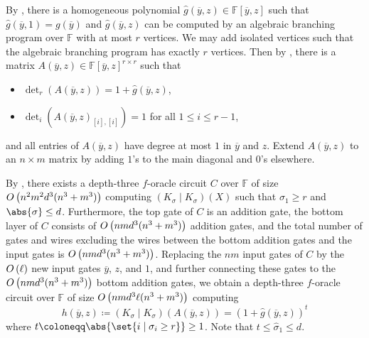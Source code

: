 \documentclass[10pt,a4paper]{amsart}
\newcommand*\F{\mathbb{F}}
\newcommand*\defeq{\coloneqq}
\newcommand*\bigO[1]{%
    O\kern-0.0pt\left(#1\right)
}
\begin{document}
\begin{pf}
    By , there is a homogeneous polynomial $\widehat{g}(\overline{y}, z) \in \F[\overline{y}, z]$ such that $\widehat{g}(\overline{y}, 1) = g(\overline{y})$ and $\widehat{g}(\overline{y}, z)$ can be computed by an algebraic branching program over $\F$ with at most $r$ vertices.
    We may add isolated vertices such that the algebraic branching program has exactly $r$ vertices.
    Then by , there is a matrix $A(\overline{y}, z) \in \F[\overline{y}, z]^{r \times r}$  such that
    \begin{itemize}
        \item $\det_r(A(\overline{y}, z)) = 1 + \widehat{g}(\overline{y}, z)$,
        \item $\det_i(A(\overline{y}, z)_{[i], [i]}) = 1$ for all $1 \leq i \leq r - 1$,
    \end{itemize}
    and all entries of $A(\overline{y}, z)$ have degree at most $1$ in $\overline{y}$ and $z$.  
    Extend $A(\overline{y}, z)$ to an $n\times m$ matrix by adding $1$'s to the main diagonal and $0$'s elsewhere.

   By , there exists a depth-three $f$-oracle circuit $C$ over $\F$ of size $\bigO{n^2m^2d^3(n^3+m^3)}$ computing $(K_\sigma \mid K_\sigma)(X)$ such that $\sigma_1 \geq r$ and $\abs{\sigma} \leq d$.
   Furthermore, the top gate of $C$ is an addition gate, the bottom layer of $C$ consists of $\bigO{nmd^3(n^3+m^3)}$ addition gates, and the total number of gates and wires excluding the wires between the bottom addition gates and the input gates is $\bigO{nmd^3(n^3+m^3)}$.
   Replacing the $nm$ input gates of $C$ by the $\bigO{\ell}$ new input gates $\overline{y}$, $z$, and $1$, and further connecting these gates to the $\bigO{nmd^3(n^3+m^3)}$ bottom addition gates, we obtain a depth-three $f$-oracle circuit over $\F$ of size $\bigO{nmd^3\ell(n^3+m^3)}$ computing 
    \[
        h(\overline{y}, z) \defeq(K_\sigma \mid K_\sigma)(A(\overline{y}, z)) = (1 + \widehat{g}(\overline{y}, z))^t
    \]
    where $t \defeq \abs{\set{i \mid \sigma_i \geq r}} \geq 1$.
    Note that $t \leq \widehat{\sigma}_1 \leq d$.
    

\end{pf}
\end{document}
